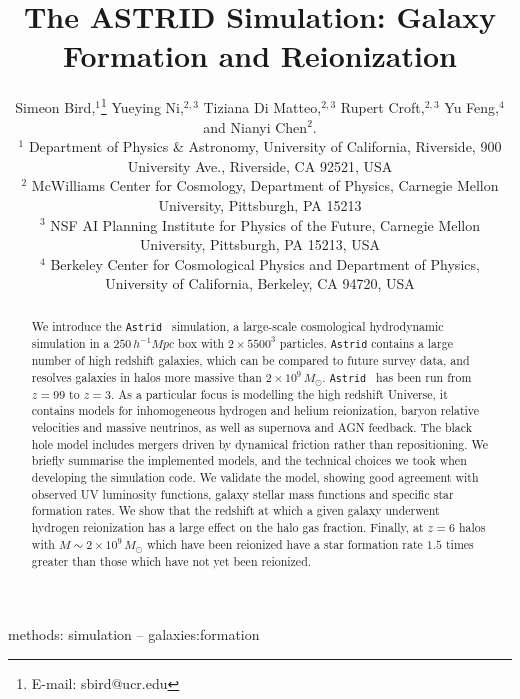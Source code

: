 \documentclass[fleqn,usenatbib]{mnras}
\title[ASTRID Galaxies and Reionization]{The ASTRID Simulation: Galaxy Formation and Reionization}
\author[S.~Bird et al.]{
Simeon Bird,$^{1}$\thanks{E-mail: sbird@ucr.edu}
Yueying Ni,$^{2,3}$
Tiziana Di Matteo,$^{2,3}$
Rupert Croft,$^{2,3}$
Yu Feng,$^{4}$
and Nianyi Chen$^{2}$.
\\
$^{1}$ Department of Physics \& Astronomy, University of California, Riverside, 900 University Ave., Riverside, CA 92521, USA\\
$^{2}$ McWilliams Center for Cosmology, Department of Physics, Carnegie Mellon University, Pittsburgh, PA 15213 \\
$^{3}$ NSF AI Planning Institute for Physics of the Future, 
Carnegie Mellon  University, Pittsburgh, PA 15213, USA \\
$^{4}$ Berkeley Center for Cosmological Physics and Department of Physics, University of California, Berkeley, CA 94720, USA
}
\newcommand{\mpch}{\,h^{-1}\unit{Mpc}}
\def\astrid{\texttt{Astrid} }
\def\msun{\, M_{\odot}}
\begin{document}
\label{firstpage}
\pagerange{\pageref{firstpage}--\pageref{lastpage}}
\maketitle

\begin{abstract}
We introduce the \astrid~simulation, a large-scale cosmological hydrodynamic simulation in a $250 \mpch$ box with $2\times 5500^3$ particles. \astrid contains a large number of high redshift galaxies, which can be compared to future survey data, and resolves galaxies in halos more massive than $2\times 10^9 \msun$. \astrid~has been run from $z=99$ to $z=3$. As a particular focus is modelling the high redshift Universe, it contains models for inhomogeneous hydrogen and helium reionization, baryon relative velocities and massive neutrinos, as well as supernova and AGN feedback. The black hole model includes mergers driven by dynamical friction rather than repositioning. We briefly summarise the implemented models, and the technical choices we took when developing the simulation code. We validate the model, showing good agreement with observed UV luminosity functions, galaxy stellar mass functions and specific star formation rates. We show that the redshift at which a given galaxy underwent hydrogen reionization has a large effect on the halo gas fraction. Finally, at $z=6$ halos with $M \sim 2\times 10^9 \msun$ which have been reionized have a star formation rate $1.5$ times greater than those which have not yet been reionized.
\end{abstract}

\begin{keywords}
methods: simulation
--
galaxies:formation
\end{keywords}


\end{document}
